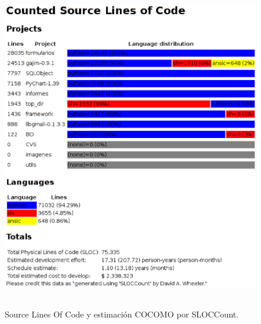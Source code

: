 \documentclass[a4paper]{article}
\begin{document}
        \begin{figure}[!ht]
            \centering
                    \includegraphics[width=12.5cm,height=13.5cm]{sloc.eps}\\
                \caption{Source Lines Of Code y estimación COCOMO por SLOCCount.}
                \label{sloc}
        \end{figure}\par
\end{document}
